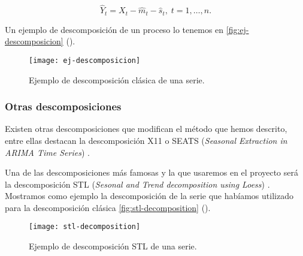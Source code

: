 \begin{equation}
  \hat{Y}_t = X_t - \hat{m}_t - \hat{s}_t, \; t = 1, \ldots, n.
  \label{eq:decomp-6}
\end{equation}

Un ejemplo de descomposición de un proceso lo tenemos en \autoref{fig:ej-descomposicion} (\cite{hyndman2018forecasting}).

\begin{figure}[htpb]
  \centering
  \texttt{[image: ej-descomposicion]}
  \caption{Ejemplo de descomposición clásica de una serie.}
  \label{fig:ej-descomposicion}
\end{figure}

\subsubsection{Otras descomposiciones}

Existen otras descomposiciones que modifican el método que hemos descrito, entre ellas destacan la descomposición X11 \cite{shiskin1965x, dagum2016seasonal} o SEATS (\emph{Seasonal Extraction in ARIMA Time Series}) \cite{gomez1995programs, dagum2016seasonal}.

Una de las descomposiciones más famosas y la que usaremos en el proyecto será la descomposición STL (\emph{Sesonal and Trend decomposition using Loess}) \cite{cleveland1990stl}. Mostramos como ejemplo la descomposición de la serie que habíamos utilizado para la descomposición clásica \autoref{fig:stl-decomposition} (\cite{hyndman2018forecasting}).

\begin{figure}[htpb]
  \centering
  \texttt{[image: stl-decomposition]}
  \caption{Ejemplo de descomposición STL de una serie.}
  \label{fig:stl-decomposition}
\end{figure}

\endinput
